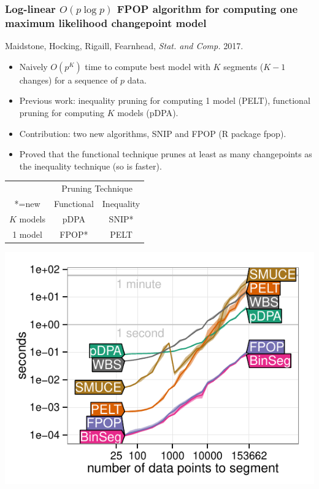 \documentclass{beamer}
\newcommand{\algo}[1]{\textcolor{#1}{#1}}
\begin{document}
\begin{frame}
  \frametitle{Log-linear $O(p \log p)$ FPOP algorithm for computing one
    maximum
    likelihood changepoint model}

  Maidstone, Hocking, Rigaill, Fearnhead, {\it Stat. and
    Comp.} 2017.

  \begin{itemize}
  \item Naively $O(p^K)$ time to compute best model with $K$ segments
    ($K-1$ changes) for a sequence of $p$ data.
  \item Previous work: inequality pruning for computing 1 model (\algo{PELT}),
    functional pruning for computing $K$ models (\algo{pDPA}).
  \item Contribution: two new algorithms, SNIP and
    \algo{FPOP} (R package fpop).
  \item Proved that the functional technique prunes at least as many
    changepoints as the inequality technique (so is faster).
  \end{itemize}

  \begin{minipage}{0.55\linewidth}
        \begin{tabular}{c|cc}
      & \multicolumn{2}{c}{Pruning Technique}\\
*=new      & Functional & Inequality \\ 
\hline
      $K$ models & \algo{pDPA} & SNIP* \\
      1 model & \algo{FPOP}* & \algo{PELT}
    \end{tabular}
  \end{minipage}
  \begin{minipage}{0.4\linewidth}
    \includegraphics[width=\textwidth]{figure-systemtime-arrays-bins}
  \end{minipage}
\end{frame}
\end{document}
